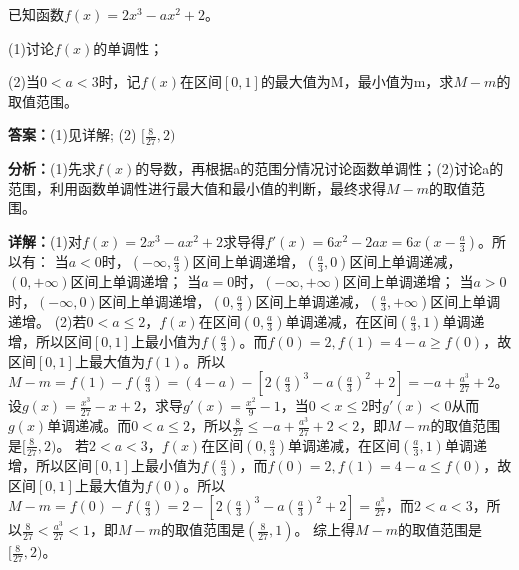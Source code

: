 \begin{question}[points=12]
已知函数$f(x)=2x^3-ax^2+2$。

(1)讨论$f(x)$的单调性；

(2)当$0<a<3$时，记$f(x)$在区间$[0,1]$的最大值为M，最小值为m，求$M-m$的取值范围。
\begin{solution}
\textbf{答案：}(1)见详解; (2) $[\frac{8}{27},2)$

\textbf{分析：}(1)先求$f(x)$的导数，再根据a的范围分情况讨论函数单调性；(2)讨论a的范围，利用函数单调性进行最大值和最小值的判断，最终求得$M-m$的取值范围。

\textbf{详解：}(1)对$f(x)=2x^3-ax^2+2$求导得$f'(x)=6x^2-2ax=6x(x-\frac{a}{3})$。所以有：
当$a<0$时，$(-\infty,\frac{a}{3})$区间上单调递增，$(\frac{a}{3},0)$区间上单调递减，$(0,+\infty)$区间上单调递增；
当$a=0$时，$(-\infty,+\infty)$区间上单调递增；
当$a>0$时，$(-\infty,0)$区间上单调递增，$(0,\frac{a}{3})$区间上单调递减，$(\frac{a}{3},+\infty)$区间上单调递增。
(2)若$0<a\le2$，$f(x)$在区间$(0,\frac{a}{3})$单调递减，在区间$(\frac{a}{3},1)$单调递增，所以区间$[0,1]$上最小值为$f(\frac{a}{3})$。而$f(0)=2,f(1)=4-a\ge f(0)$，故区间$[0,1]$上最大值为$f(1)$。所以$M-m=f(1)-f(\frac{a}{3})=(4-a)-[2(\frac{a}{3})^3-a(\frac{a}{3})^2+2]=-a+\frac{a^3}{27}+2$。设$g(x)=\frac{x^3}{27}-x+2$，求导$g'(x)=\frac{x^2}{9}-1$，当$0<x\le2$时$g'(x)<0$从而$g(x)$单调递减。而$0<a\le2$，所以$\frac{8}{27}\le -a+\frac{a^3}{27}+2<2$，即$M-m$的取值范围是$[\frac{8}{27},2)$。
若$2<a<3$，$f(x)$在区间$(0,\frac{a}{3})$单调递减，在区间$(\frac{a}{3},1)$单调递增，所以区间$[0,1]$上最小值为$f(\frac{a}{3})$，而$f(0)=2,f(1)=4-a\le f(0)$，故区间$[0,1]$上最大值为$f(0)$。所以$M-m=f(0)-f(\frac{a}{3})=2-[2(\frac{a}{3})^3-a(\frac{a}{3})^2+2]=\frac{a^3}{27}$，而$2<a<3$，所以$\frac{8}{27}<\frac{a^3}{27}<1$，即$M-m$的取值范围是$(\frac{8}{27},1)$。
综上得$M-m$的取值范围是$[\frac{8}{27},2)$。
\end{solution}
\end{question}

